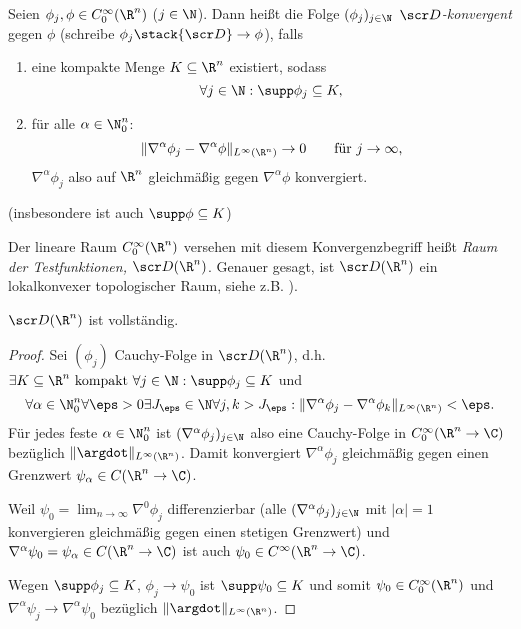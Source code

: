 \begin{df} \label{5.2}
	Seien $\phi_j, \phi \in C_0^\infty(\R^n)$ ($j \in \N$).
	Dann heißt die Folge $(\phi_j)_{j\in \N}$ \emph{$\scr D$-konvergent} gegen $\phi$ (schreibe $\phi_j \stack {\scr D}\to \phi$), falls
	\begin{enumerate}[1)]
		\item
			eine kompakte Menge $K \subset \R^n$ existiert, sodass
			\[
				\forall j \in \N: \supp \phi_j \subset K,
			\]
		\item
			für alle $\alpha \in \N_0^n$:
			\[
				\|\nabla^\alpha \phi_j - \nabla^\alpha \phi\|_{L^\infty(\R^n)} \to 0
				\qquad \text{für $j \to \infty$,}
			\]
			$\nabla^\alpha \phi_j$ also auf $\R^n$ gleichmäßig gegen $\nabla^\alpha \phi$ konvergiert.
	\end{enumerate}
	(insbesondere ist auch $\supp \phi \subset K$)

	Der lineare Raum $C_0^\infty(\R^n)$ versehen mit diesem Konvergenzbegriff heißt \emph{Raum der Testfunktionen, $\scr D(\R^n)$}.
	Genauer gesagt, ist $\scr D(\R^n)$ ein lokalkonvexer topologischer Raum, siehe z.B. \cite{Reed-Simon}).
\end{df}

\begin{st} \label{5.3}
	$\scr D(\R^n)$ ist vollständig.
	\begin{proof}
		Sei $(\phi_j)$ Cauchy-Folge in $\scr D(\R^n)$, d.h. $\exists K \subset \R^n \text{ kompakt } \forall j \in \N: \supp \phi_j \subset K$ und
		\[
			\forall \alpha \in \N_0^n \forall \eps > 0 \exists J_\eps \in \N \forall j,k > J_\eps : \|\nabla^\alpha \phi_j - \nabla^\alpha \phi_k \|_{L^\infty(\R^n)} < \eps.
		\]
		Für jedes feste $\alpha \in \N_0^n$ ist $(\nabla^\alpha \phi_j)_{j\in \N}$ also eine Cauchy-Folge in $C_0^\infty(\R^n \to \C)$ bezüglich $\|\argdot\|_{L^\infty(\R^n)}$.
		Damit konvergiert $\nabla^\alpha \phi_j$ gleichmäßig gegen einen Grenzwert $\psi_\alpha \in C(\R^n \to \C)$.

		Weil $\psi_0 = \lim_{n\to \infty} \nabla^0 \phi_j$ differenzierbar (alle $(\nabla^\alpha \phi_j)_{j\in\N}$ mit $|\alpha|=1$ konvergieren gleichmäßig gegen einen stetigen Grenzwert) und $\nabla^\alpha \psi_0 = \psi_\alpha \in C(\R^n \to \C)$ ist auch $\psi_0 \in C^\infty (\R^n \to \C)$.

		Wegen $\supp \phi_j \subset K$, $\phi_j \to \psi_0$ ist $\supp \psi_0 \subset K$ und somit $\psi_0 \in C_0^\infty(\R^n)$ und $\nabla^\alpha \psi_j \to \nabla^\alpha \psi_0$ bezüglich $\|\argdot\|_{L^\infty(\R^n)}$.
	\end{proof}
\end{st}

